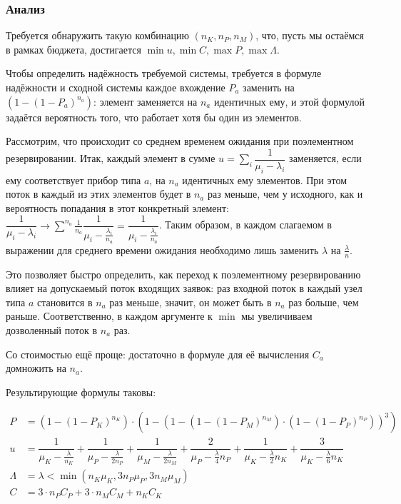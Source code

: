 \documentclass[12pt, a4paper] {ncc}
\begin{document}
\subsubsection*{Анализ}

Требуется обнаружить такую комбинацию $(n_K, n_P, n_M)$, что, пусть мы остаёмся
в рамках бюджета, достигается $\min u, \min C, \max P, \max \Lambda$.

Чтобы определить надёжность требуемой системы, требуется в формуле надёжности и
сходной системы каждое вхождение $P_a$ заменить на $\left(1 - (1 -
P_a)^{n_a}\right)$: элемент заменяется на $n_a$ идентичных ему, и этой формулой
задаётся вероятность того, что работает хотя бы один из элементов.

Рассмотрим, что происходит со среднем временем ожидания при поэлементном
резервировании. Итак, каждый элемент в сумме $u = \sum_i \dfrac{1}{\mu_i -
\lambda_i}$ заменяется, если ему соответствует прибор типа $a$, на $n_a$
идентичных ему элементов. При этом поток в каждый из этих элементов будет в
$n_a$ раз меньше, чем у исходного, как и вероятность попадания в этот
конкретный элемент: $\dfrac{1} {\mu_i - \lambda_i} \rightarrow \sum^{n_a}
\frac{1}{n_a} \dfrac{1}{\mu_i - \frac {\lambda_i}{n_a}} =
\dfrac{1}{\mu_i - \frac{\lambda_i}{n_a}}$. Таким образом, в каждом слагаемом в
выражении для среднего времени ожидания необходимо лишь заменить $\lambda$ на
$\frac{\lambda}{n}$.

Это позволяет быстро определить, как переход к поэлементному резервированию
влияет на допускаемый поток входящих заявок: раз входной поток в каждый узел
типа $a$ становится в $n_a$ раз меньше, значит, он может быть в $n_a$ раз
больше, чем раньше. Соответственно, в каждом аргументе к $\min$ мы увеличиваем
дозволенный поток в $n_a$ раз.

Со стоимостью ещё проще: достаточно в формуле для её вычисления $C_a$ домножить
на $n_a$.

Результирующие формулы таковы:

$$\begin{aligned}
P &= \left(1 - (1 - P_K)^{n_K}\right) \cdot
     \left(1 - \left(1 -
               \left(1 - (1 - P_M)^{n_M}\right) \cdot
               \left(1 - (1 - P_P)^{n_P}\right)
               \right)^3\right) \\
u &= 
       \dfrac {1} {\mu_K - \frac{\lambda}{n_K}} +
       \dfrac {1} {\mu_P - \frac {\lambda}{2n_P}} +
	   \dfrac {1} {\mu_M - \frac {\lambda} {2n_M}} +
       \dfrac {2} {\mu_P - \frac {\lambda}{4}n_P} +
       \dfrac {1} {\mu_K - \frac {\lambda}{2}n_K} +
       \dfrac {3} {\mu_K - \frac {\lambda}{6}n_K}\\
\Lambda &= \lambda < \min\left(n_K\mu_K, 3n_P\mu_P, 3n_M\mu_M\right) \\
C       &= 3 \cdot n_P C_P + 3 \cdot n_M C_M + n_K C_K
\end{aligned}$$
\end{document}
